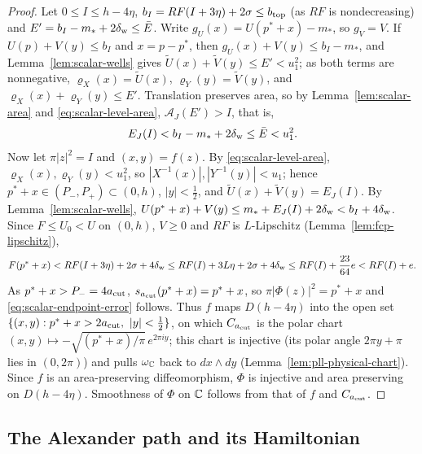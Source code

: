 \begin{proof}
Let $0\le I\le h-4\eta$, $b_I=RF(I+3\eta)+2\sigma\le b_{\rm top}$ (as $RF$ is nondecreasing) and
$E'=b_I-m_*+2\delta_{\rm w}\le\bar E$. Write $g_U(x)=U(p^*+x)-m_*$, so $g_V=V$. If $U(p)+V(y)\le b_I$ and $x=p-p^*$, then
$g_U(x)+V(y)\le b_I-m_*$, and Lemma~\ref{lem:scalar-wells} gives $\widetilde U(x)+\widetilde V(y)\le E'<u_1^2$; as both
terms are nonnegative, $\varrho_X(x)=\widetilde U(x)$, $\varrho_Y(y)=\widetilde V(y)$, and
$\varrho_X(x)+\varrho_Y(y)\le E'$. Translation preserves area, so by Lemma~\ref{lem:scalar-area} and
\eqref{eq:scalar-level-area}, $\mathcal A_J(E')>I$, that is,
\begin{equation}\label{eq:scalar-energy-error}
 E_J(I)<b_I-m_*+2\delta_{\rm w}\le\bar E<u_1^2.
\end{equation}
Now let $\pi|z|^2=I$ and $(x,y)=f(z)$. By \eqref{eq:scalar-level-area}, $\varrho_X(x),\varrho_Y(y)<u_1^2$, so
$|X^{-1}(x)|,|Y^{-1}(y)|<u_1$; hence $p^*+x\in(P_-,P_+)\subset(0,h)$, $|y|<\frac12$, and
$\widetilde U(x)+\widetilde V(y)=E_J(I)$. By Lemma~\ref{lem:scalar-wells},
$U(p^*+x)+V(y)\le m_*+E_J(I)+2\delta_{\rm w}<b_I+4\delta_{\rm w}$. Since $F\le U_0<U$ on $(0,h)$, $V\ge0$ and $RF$ is
$L$-Lipschitz (Lemma~\ref{lem:fcp-lipschitz}),
\[
 F(p^*+x)<RF(I+3\eta)+2\sigma+4\delta_{\rm w}\le RF(I)+3L\eta+2\sigma+4\delta_{\rm w}
 \le RF(I)+\frac{23}{64}e<RF(I)+e.
\]
As $p^*+x>P_-=4a_{\rm cut}$, $s_{a_{\rm cut}}(p^*+x)=p^*+x$, so $\pi|\Phi(z)|^2=p^*+x$ and
\eqref{eq:scalar-endpoint-error} follows. Thus $f$ maps $D(h-4\eta)$ into the open set
$\{(x,y):p^*+x>2a_{\rm cut},\ |y|<\frac12\}$, on which $C_{a_{\rm cut}}$ is the polar chart
$(x,y)\mapsto-\sqrt{(p^*+x)/\pi}\,e^{2\pi iy}$; this chart is injective (its polar angle $2\pi y+\pi$ lies in
$(0,2\pi)$) and pulls $\omega_{\mathbb{C}}$ back to $dx\wedge dy$ (Lemma~\ref{lem:pll-physical-chart}). Since $f$ is an
area-preserving diffeomorphism, $\Phi$ is injective and area preserving on $D(h-4\eta)$. Smoothness of $\Phi$ on $\mathbb{C}$
follows from that of $f$ and $C_{a_{\rm cut}}$.
\end{proof}

\subsection{The Alexander path and its Hamiltonian}\label{sec:scalar-isotopy}

